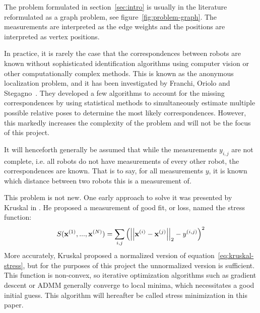 The problem formulated in section~\ref{sec:intro} is usually in the literature reformulated as a graph problem, see figure~\ref{fig:problem-graph}. The measurements are interpreted as the edge weights and the positions are interpreted as vertex positions. 

In practice, it is rarely the case that the correspondences between robots are known without sophisticated identification algorithms using computer vision or other computationally complex methods. This is known as the anonymous localization problem, and it has been investigated by Franchi, Oriolo and Stegagno~\cite{anonymous_loc_1,anonymous_loc_2,anonymous_loc_3}. They developed a few algorithms to account for the missing correspondences by using statistical methods to simultaneously estimate multiple possible relative poses to determine the most likely correspondences. However, this markedly increases the complexity of the problem and will not be the focus of this project.

It will henceforth generally be assumed that while the measurements $y_{i,j}$ are not complete, i.e. all robots do not have measurements of every other robot, the correspondences are known. That is to say, for all measurements $y$, it is known which distance between two robots this is a measurement of. 

This problem is not new. One early approach to solve it was presented by Kruskal in \cite{Kruskal1964}. He proposed a measurement of good fit, or loss, named the stress function: 
\begin{align}
    \label{eq:kruskal-stress}
    S(\mathbf{x}^{(1)}, ..., \mathbf{x}^{(N)}) = \sum_{i,j} \left(
        \norm{\mathbf{x}^{(i)} - \mathbf{x}^{(j)}}_2 - y^{(i, j)}
    \right)^2
\end{align}
More accurately, Kruskal proposed a normalized version of equation~\ref{eq:kruskal-stress}, but for the purposes of this project the unnormalized version is sufficient. This function is non-convex, so iterative optimization algorithms such as gradient descent or ADMM generally converge to local minima, which necessitates a good initial guess. This algorithm will hereafter be called stress minimization in this paper.

